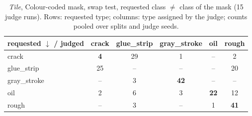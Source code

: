 \begin{table}[ht]\centering\footnotesize
\caption{\textit{Tile}, Colour-coded mask, swap test, requested class $\neq$ class of the mask (15 judge runs). Rows: requested type; columns: type assigned by the judge; counts pooled over splits and judge seeds.}
\label{tab:conf_colorfix_swap}
\begin{tabular}{@{}lccccc@{}}\toprule
requested $\downarrow$ / judged & crack & glue\_strip & gray\_stroke & oil & rough \\\midrule
crack & \textbf{4} & 29 & 1 & -- & 2 \\
glue\_strip & 25 & -- & -- & -- & 20 \\
gray\_stroke & -- & 3 & \textbf{42} & -- & -- \\
oil & 2 & 6 & 3 & \textbf{22} & 12 \\
rough & -- & 3 & -- & 1 & \textbf{41} \\
\bottomrule\end{tabular}\end{table}
